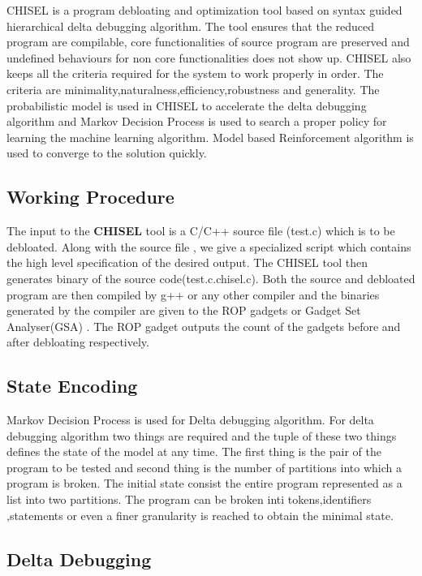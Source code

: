 \documentclass{relatorio}
\begin{document}
CHISEL is a program debloating and optimization tool based on syntax guided hierarchical delta debugging algorithm. The tool ensures that the reduced program are compilable, core functionalities of source program are preserved  and undefined behaviours for non core functionalities does not show up. CHISEL also keeps all the criteria required for the system to work properly in order. The criteria are minimality,naturalness,efficiency,robustness and generality. The probabilistic model is used in CHISEL to accelerate the delta debugging algorithm and Markov Decision Process is used to search a proper policy for learning the machine learning algorithm. Model based Reinforcement algorithm is used to converge to the solution quickly.

\subsection{Working Procedure}%
\label{Tools}

The input to the \textbf{CHISEL} tool is a C/C++ source file (test.c) which is to be debloated. Along with the source file , we give a specialized script which contains the high level specification of the desired output. The CHISEL tool then generates binary of the source code(test.c.chisel.c). Both the source and debloated program are then compiled by g++ or any other compiler and the binaries generated by the compiler are given to the ROP gadgets or Gadget Set Analyser(GSA) . The ROP gadget outputs the count of the  gadgets before and after debloating respectively.

\subsection{State Encoding}%
\label{Tools}

Markov Decision Process is used for Delta debugging algorithm. For  delta debugging algorithm two things are required and the tuple of these two things defines the state of the model at any time. The first thing is the pair of the program to be tested and second thing is the number of partitions into which a program is broken. The initial state consist the entire program  represented as a list into two partitions. The program can be broken inti tokens,identifiers ,statements or even a finer granularity is reached to obtain the minimal state.

\subsection{Delta Debugging}%
\label{Tools}
\end{document}
